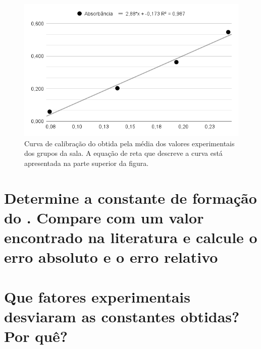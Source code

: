 \documentclass{article}
\begin{document}
\begin{figure}[H]
    \centering
    \includegraphics[width=.5\linewidth]{fig/curvaPadrao}
    \caption{Curva de calibração do  obtida pela média dos valores experimentais dos grupos da sala. A equação de reta que descreve a curva está apresentada na parte superior da figura.}\label{curvaPadrao}
\end{figure}

\section{Determine a constante de formação do . Compare com um valor encontrado na literatura e calcule o erro absoluto e o erro relativo}

\section{Que fatores experimentais desviaram as constantes obtidas? Por quê?}

    
    
\end{document}
